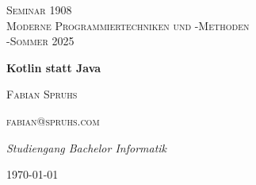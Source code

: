 \documentclass[11pt]{article}
\begin{document}
    \begin{titlepage}
        \centering
        {\scshape\LARGE Seminar 1908 \\ Moderne Programmiertechniken und -Methoden \\ -Sommer 2025 \par}
        \vspace{1cm}
        {\huge\bfseries Kotlin statt Java\par}
        \vspace{1.5cm}
        {\scshape\Large Fabian Spruhs\par}
        {\scshape fabian@spruhs.com\par}
        \vspace{2cm}
        {\Large\itshape Studiengang Bachelor Informatik\par}
        \vspace{2cm}


        {\large \today\par}
    \end{titlepage}

    \tableofcontents
    \newpage
\end{document}
